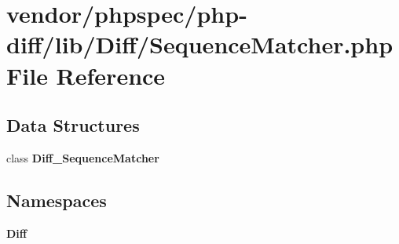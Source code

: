 \section{vendor/phpspec/php-\/diff/lib/\+Diff/\+Sequence\+Matcher.php File Reference}
\label{_sequence_matcher_8php}
\subsection*{Data Structures}
\begin{DoxyCompactItemize}
\item 
class {\bf Diff\+\_\+\+Sequence\+Matcher}
\end{DoxyCompactItemize}
\subsection*{Namespaces}
\begin{DoxyCompactItemize}
\item 
 {\bf Diff}
\end{DoxyCompactItemize}
